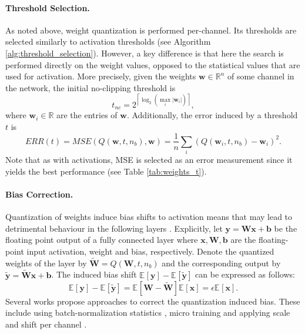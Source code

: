 \documentclass{article}
\newcommand{\vectorsym}[1]{\bm{#1}}
\newcommand{\expectation}[2]{\mathbb{E}_{#2}\left[#1\right]}
\newcommand{\brackets}[1]{\left(#1\right)}
\newcommand{\abs}[1]{\left|#1\right|}
\newcommand{\matsym}[1]{\mathbf{#1}}
\newcommand{\ceil}[1]{\left\lceil#1\right\rceil}
\begin{document}
\paragraph{Threshold Selection.} 
As noted above, weight quantization is performed per-channel. Its thresholds are selected similarly to activation thresholds (see Algorithm \ref{alg:threshold_selection}). However, a key difference is that here the search is performed directly on the weight values, opposed to the statistical values that are used for activation.
More precisely, given the weights $\vectorsym{w}\in\mathbb{R}^{n}$ of some channel in the network, the initial no-clipping threshold is 
\begin{equation}\label{eq:no_clipping_w}
    t_{nc}=2^{\ceil{\log_2\brackets{\max\limits_i \abs{\vectorsym{w}_i}}}},
\end{equation}
where $\vectorsym{w}_i\in\mathbb{R}$ are the entries of $\vectorsym{w}$. 
Additionally, the error induced by a threshold $t$ is
\begin{equation}
    ERR\brackets{t}=MSE(Q(\vectorsym{w},t,n_b),\vectorsym{w})=\frac{1}{n}\sum_i \brackets{Q(\vectorsym{w}_i,t,n_b)-\vectorsym{w}_i}^2.
\end{equation} 
Note that as with activations, MSE is selected as an error measurement since it yields the best performance (see Table \ref{tab:weights_t}). 














\paragraph{Bias Correction.} Quantization of weights induce bias shifts to activation means that may lead to detrimental behaviour in the following layers \cite{nagel2019data,finkelstein2019fighting}.  
Explicitly, let $\vectorsym{y}=\matsym{W}\vectorsym{x}+\vectorsym{b}$ be the floating point output of a fully connected layer where $\vectorsym{x}, \matsym{W}, \vectorsym{b}$ are the floating-point input activation, weight and bias, respectively. 
Denote the quantized weights of the layer by $\tilde{\matsym{W}} = Q(\matsym{W},t,n_b)$
and the corresponding output by
$\tilde{\vectorsym{y}}=\tilde{\matsym{W}}\vectorsym{x}+\vectorsym{b}$.
The induced bias shift $\expectation{\vectorsym{y}}{}-\expectation{\tilde{\vectorsym{y}}}{}$ can be expressed as follows:
\begin{equation}\label{eq:bias_correction}
    \expectation{\vectorsym{y}}{}-\expectation{\tilde{\vectorsym{y}}}{}=\expectation{\matsym{W}-\tilde{\matsym{W}}}{}\expectation{\vectorsym{x}}{}=\epsilon\expectation{\vectorsym{x}}{}.
\end{equation}
Several works propose approaches to correct the quantization induced bias. 
These include using batch-normalization statistics \cite{nagel2019data}, micro training  \cite{finkelstein2019fighting} and applying scale and shift per channel \cite{NEURIPS2019_c0a62e13}.
\end{document}
